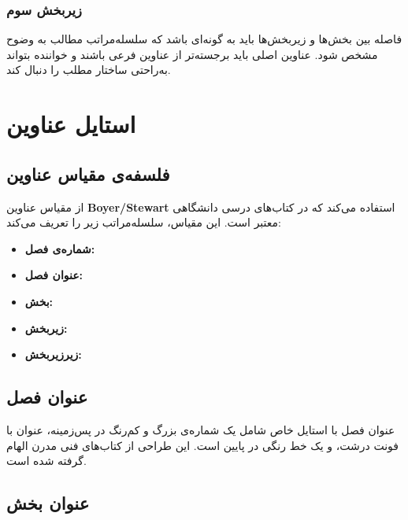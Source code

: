 \documentclass{matinbook}
\begin{document}
\subsection{زیربخش سوم}
\label{sec:headers-sub3}

فاصله بین بخش‌ها و زیربخش‌ها باید به گونه‌ای باشد که
سلسله‌مراتب مطالب به وضوح مشخص شود. عناوین اصلی باید
برجسته‌تر از عناوین فرعی باشند و خواننده بتواند
به‌راحتی ساختار مطلب را دنبال کند.

\chapter{استایل عناوین}
\label{chap:headings}

\section{فلسفه‌ی مقیاس عناوین}
\label{sec:headings-philosophy}

 از مقیاس عناوین \textbf{Boyer/Stewart} استفاده
می‌کند که در کتاب‌های درسی دانشگاهی معتبر است. این مقیاس،
سلسله‌مراتب زیر را تعریف می‌کند:

\begin{itemize}
    \item \textbf{شماره‌ی فصل:} \pnum{۲۴pt}
    \item \textbf{عنوان فصل:} \pnum{۲۰pt}
    \item \textbf{بخش:} \pnum{۱۵pt}
    \item \textbf{زیربخش:} \pnum{۱۳pt}
    \item \textbf{زیرزیربخش:} \pnum{۱۱pt}
\end{itemize}

\section{عنوان فصل}
\label{sec:headings-chapter}

عنوان فصل با استایل خاص  شامل یک شماره‌ی
بزرگ و کم‌رنگ در پس‌زمینه، عنوان با فونت درشت، و یک خط
رنگی در پایین است. این طراحی از کتاب‌های فنی مدرن الهام
گرفته شده است.

\section{عنوان بخش}
\label{sec:headings-section}
\end{document}
